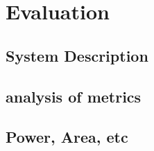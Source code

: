 \section{Evaluation}

\subsection{System Description}

\subsection{analysis of metrics}

\subsection{Power, Area, etc}
